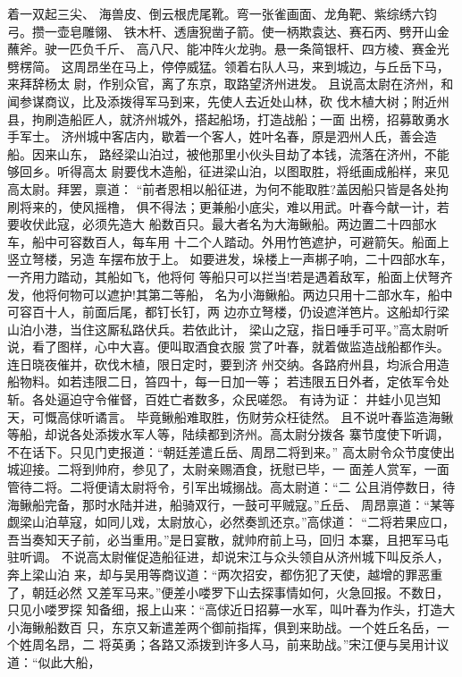 着一双起三尖、
海兽皮、倒云根虎尾靴。弯一张雀画面、龙角靶、紫综绣六钧弓。攒一壶皂雕翎、
铁木杆、透唐猊凿子箭。使一柄欺袁达、赛石丙、劈开山金蘸斧。驶一匹负千斤、
高八尺、能冲阵火龙驹。悬一条简银杆、四方棱、赛金光劈楞简。
这周昂坐在马上，停停威猛。领着右队人马，来到城边，与丘岳下马，来拜辞杨太
尉，作别众官，离了东京，取路望济州进发。
且说高太尉在济州，和闻参谋商议，比及添拨得军马到来，先使人去近处山林，砍
伐木植大树；附近州县，拘刷造船匠人，就济州城外，搭起船场，打造战船；一面
出榜，招募敢勇水手军士。
济州城中客店内，歇着一个客人，姓叶名春，原是泗州人氏，善会造船。因来山东，
路经梁山泊过，被他那里小伙头目劫了本钱，流落在济州，不能够回乡。听得高太
尉要伐木造船，征进梁山泊，以图取胜，将纸画成船样，来见高太尉。拜罢，禀道：
“前者恩相以船征进，为何不能取胜?盖因船只皆是各处拘刷将来的，使风摇橹，
俱不得法；更兼船小底尖，难以用武。叶春今献一计，若要收伏此寇，必须先造大
船数百只。最大者名为大海鳅船。两边置二十四部水车，船中可容数百人，每车用
十二个人踏动。外用竹笆遮护，可避箭矢。船面上竖立弩楼，另造车摆布放于上。
如要进发，垛楼上一声梆子响，二十四部水车，一齐用力踏动，其船如飞，他将何
等船只可以拦当!若是遇着敌军，船面上伏弩齐发，他将何物可以遮护!其第二等船，
名为小海鳅船。两边只用十二部水车，船中可容百十人，前面后尾，都钉长钉，两
边亦立弩楼，仍设遮洋笆片。这船却行梁山泊小港，当住这厮私路伏兵。若依此计，
梁山之寇，指日唾手可平。”高太尉听说，看了图样，心中大喜。便叫取酒食衣服
赏了叶春，就着做监造战船都作头。连日晓夜催并，砍伐木植，限日定时，要到济
州交纳。各路府州县，均派合用造船物料。如若违限二日，笞四十，每一日加一等；
若违限五日外者，定依军令处斩。各处逼迫守令催督，百姓亡者数多，众民嗟怨。
有诗为证：
井蛙小见岂知天，可慨高俅听谲言。
毕竟鳅船难取胜，伤财劳众枉徒然。
且不说叶春监造海鳅等船，却说各处添拨水军人等，陆续都到济州。高太尉分拨各
寨节度使下听调，不在话下。只见门吏报道：“朝廷差遣丘岳、周昂二将到来。”
高太尉令众节度使出城迎接。二将到帅府，参见了，太尉亲赐酒食，抚慰已毕，一
面差人赏军，一面管待二将。二将便请太尉将令，引军出城搦战。高太尉道：“二
公且消停数日，待海鳅船完备，那时水陆并进，船骑双行，一鼓可平贼寇。”丘岳、
周昂禀道：“某等觑梁山泊草寇，如同儿戏，太尉放心，必然奏凯还京。”高俅道：
“二将若果应口，吾当奏知天子前，必当重用。”是日宴散，就帅府前上马，回归
本寨，且把军马屯驻听调。
不说高太尉催促造船征进，却说宋江与众头领自从济州城下叫反杀人，奔上梁山泊
来，却与吴用等商议道：“两次招安，都伤犯了天使，越增的罪恶重了，朝廷必然
又差军马来。”便差小喽罗下山去探事情如何，火急回报。不数日，只见小喽罗探
知备细，报上山来：“高俅近日招募一水军，叫叶春为作头，打造大小海鳅船数百
只，东京又新遣差两个御前指挥，俱到来助战。一个姓丘名岳，一个姓周名昂，二
将英勇；各路又添拨到许多人马，前来助战。”宋江便与吴用计议道：“似此大船，
